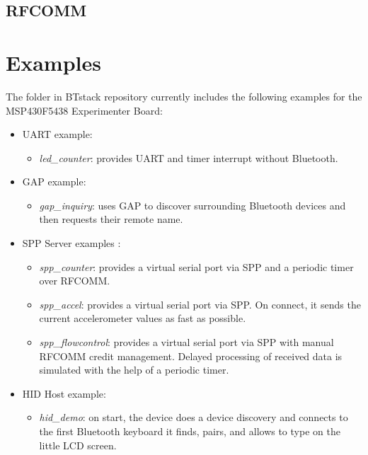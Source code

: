 \documentclass[a4paper,titlepage,oneside,12pt]{amsart} %
\begin{document}
\subsection{RFCOMM}



\section{Examples}
\label{examples}
The  folder in BTstack repository currently includes the following examples for the MSP430F5438 Experimenter Board:
\begin{itemize}
\item UART example:
    \begin{itemize}
    \item \emph{led\_counter}: provides UART and timer interrupt without Bluetooth.
    \end{itemize}
\item GAP example:
    \begin{itemize}
    \item \emph{gap\_inquiry}: uses GAP to discover surrounding Bluetooth devices and then requests their remote name.
    \end{itemize}
\item SPP Server examples :
    \begin{itemize}
    \item \emph{spp\_counter}: provides a virtual serial port via SPP and a periodic timer over RFCOMM. 
    \item \emph{spp\_accel}: provides a virtual serial port via SPP. On connect, it sends the current accelerometer values as fast as possible.
    \item \emph{spp\_flowcontrol}: provides a virtual serial port via SPP with manual RFCOMM credit management. Delayed processing of received data is simulated with the help of a periodic timer. 
    \end{itemize}
\item HID Host example:
    \begin{itemize}                                    
    \item \emph{hid\_demo}: on start, the device does a device discovery and connects to the first Bluetooth keyboard it finds, pairs, and allows to type on the little LCD screen. 

\end{itemize}
\end{itemize}
\end{document}
